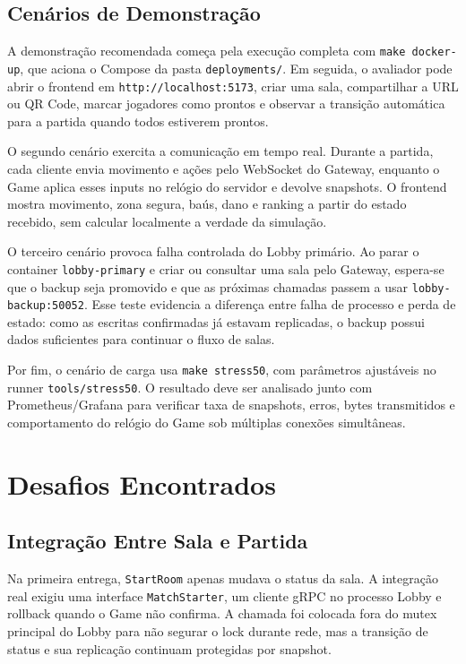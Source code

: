 \documentclass[portuguese]{sbcreviews-2025}%
\begin{document}
\subsection{Cenários de Demonstração}

A demonstração recomendada começa pela execução completa com \texttt{make docker-up}, que aciona o Compose da pasta \texttt{deployments/}. Em seguida, o avaliador pode abrir o frontend em \texttt{http://localhost:5173}, criar uma sala, compartilhar a URL ou QR Code, marcar jogadores como prontos e observar a transição automática para a partida quando todos estiverem prontos.

O segundo cenário exercita a comunicação em tempo real. Durante a partida, cada cliente envia movimento e ações pelo WebSocket do Gateway, enquanto o Game aplica esses inputs no relógio do servidor e devolve snapshots. O frontend mostra movimento, zona segura, baús, dano e ranking a partir do estado recebido, sem calcular localmente a verdade da simulação.

O terceiro cenário provoca falha controlada do Lobby primário. Ao parar o container \texttt{lobby-primary} e criar ou consultar uma sala pelo Gateway, espera-se que o backup seja promovido e que as próximas chamadas passem a usar \texttt{lobby-backup:50052}. Esse teste evidencia a diferença entre falha de processo e perda de estado: como as escritas confirmadas já estavam replicadas, o backup possui dados suficientes para continuar o fluxo de salas.

Por fim, o cenário de carga usa \texttt{make stress50}, com parâmetros ajustáveis no runner \texttt{tools/stress50}. O resultado deve ser analisado junto com Prometheus/Grafana para verificar taxa de snapshots, erros, bytes transmitidos e comportamento do relógio do Game sob múltiplas conexões simultâneas.

\section{Desafios Encontrados}

\subsection{Integração Entre Sala e Partida}

Na primeira entrega, \texttt{StartRoom} apenas mudava o status da sala. A integração real exigiu uma interface \texttt{MatchStarter}, um cliente gRPC no processo Lobby e rollback quando o Game não confirma. A chamada foi colocada fora do mutex principal do Lobby para não segurar o lock durante rede, mas a transição de status e sua replicação continuam protegidas por snapshot.
\end{document}
